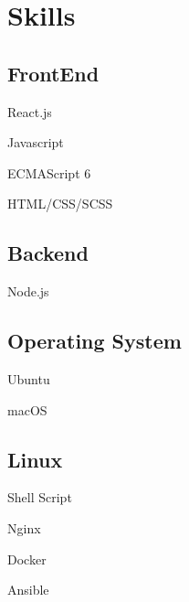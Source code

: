 \documentclass[]{deedy-resume-openfont}
\begin{document}
\begin{minipage}[t]{0.5\textwidth}

\section{Skills}

\begin{minipage}[t]{0.45\textwidth}
    \subsection{FrontEnd}
    \vspace{\topsep}
    \begin{tightemize}
        \item React.js
        \item Javascript
        \item ECMAScript 6
        \item HTML/CSS/SCSS
    \end{tightemize}
\end{minipage}
\hfill
\begin{minipage}[t]{0.45\textwidth}
    \subsection{Backend}
    \vspace{\topsep}
    \begin{tightemize}
        \item Node.js
    \end{tightemize}
\end{minipage}

\vspace{\topsep}
\begin{minipage}[t]{0.45\textwidth}
    \subsection{Operating System}
    \vspace{\topsep}
    \begin{tightemize}
        \item Ubuntu
        \item macOS
    \end{tightemize}
\end{minipage}
\hfill
\begin{minipage}[t]{0.45\textwidth}
    \subsection{Linux}
    \vspace{\topsep}
    \begin{tightemize}
        \item Shell Script
        \item Nginx
        \item Docker
        \item Ansible
    \end{tightemize}
\end{minipage}


\end{minipage}
\end{document}

